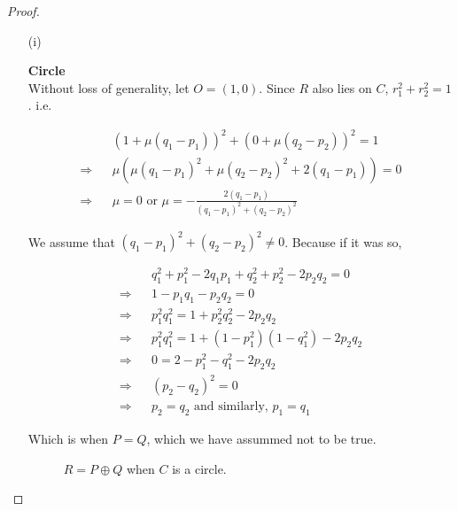 \begin{proof}
  \begin{itemize}
    \item[(i)]{\textbf{Circle}\\
        Without loss of generality, let $O=(1,0)$. Since $R$ also lies on $C$,
        $r_1^2+r_2^2=1$. i.e.

        \begin{eqnarray*}
          &&(1+\mu(q_1-p_1))^2+(0+\mu(q_2-p_2))^2=1\\
          \Rightarrow && \mu(\mu(q_1-p_1)^2+\mu(q_2-p_2)^2+2(q_1-p_1))=0\\
          \Rightarrow && \mu=0\text{ or }\mu=-\frac{2(q_1-p_1)}{(q_1-p_1)^2+(q_2-p_2)^2}
        \end{eqnarray*}

        We assume that $(q_1-p_1)^2+(q_2-p_2)^2\not=0$. Because if it was so,

        \begin{eqnarray*}
          &&q_1^2+p_1^2-2q_1p_1+q_2^2+p_2^2-2p_2q_2=0\\
          \Rightarrow&&1-p_1q_1-p_2q_2=0\\
          \Rightarrow&&p_1^2q_1^2=1+p_2^2q_2^2-2p_2q_2\\
          \Rightarrow&&p_1^2q_1^2=1+(1-p_1^2)(1-q_1^2)-2p_2q_2\\
          \Rightarrow&&0=2-p_1^2-q_1^2-2p_2q_2\\
          \Rightarrow&&(p_2-q_2)^2=0\\
          \Rightarrow&&p_2=q_2\text{ and similarly, }p_1=q_1
        \end{eqnarray*}

        Which is when $P=Q$, which we have assummed not to be true.

        \begin{figure}[H]
          \center
          \caption{$R = P \oplus Q$ when $C$ is a circle.}
        \end{figure}

}
\end{itemize}
\end{proof}
